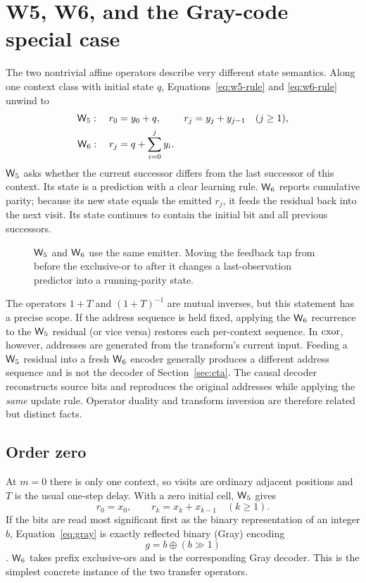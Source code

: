 \section{W5, W6, and the Gray-code special case}\label{sec:special}

The two nontrivial affine operators describe very different state semantics.  Along one context
class with initial state $q$, Equations~\eqref{eq:w5-rule} and \eqref{eq:w6-rule} unwind to
\begin{align}
\mathsf{W}_{5}:\quad
  r_0&=y_0+q,
  &r_j&=y_j+y_{j-1} &&(j\ge1),\label{eq:w5-unwind}\\
\mathsf{W}_{6}:\quad
  r_j&=q+\sum_{i=0}^{j}y_i .&&&&\label{eq:w6-unwind}
\end{align}
$\mathsf{W}_{5}$ asks whether the current successor differs from the last successor of this context.  Its
state is a prediction with a clear learning rule.  $\mathsf{W}_{6}$ reports cumulative parity; because its
new state equals the emitted $r_j$, it feeds the residual back into the next visit.  Its state
continues to contain the initial bit and all previous successors.

\begin{figure}[ht]
  \centering
  \hspace{1.1cm}
  \caption{$\mathsf{W}_{5}$ and $\mathsf{W}_{6}$ use the same emitter.  Moving the feedback tap from before the
  exclusive-or to after it changes a last-observation predictor into a running-parity state.}
  \label{fig:w5-w6-taps}
\end{figure}

The operators $1+T$ and $(1+T)^{-1}$ are mutual inverses, but this statement has a precise scope.
If the address sequence is held fixed, applying the $\mathsf{W}_{6}$ recurrence to the $\mathsf{W}_{5}$ residual (or
vice versa) restores each per-context sequence.  In $\mathrm{cxor}$, however, addresses are generated
from the transform's current input.  Feeding a $\mathsf{W}_{5}$ residual into a fresh $\mathsf{W}_{6}$
encoder generally produces a different address sequence and is not the decoder of
Section~\ref{sec:cta}.  The causal decoder reconstructs source bits and reproduces the original
addresses while applying the \emph{same} update rule.  Operator duality and transform inversion
are therefore related but distinct facts.

\subsection{Order zero}

At $m=0$ there is only one context, so visits are ordinary adjacent positions and $T$ is the
usual one-step delay.  With a zero initial cell, $\mathsf{W}_{5}$ gives
\begin{equation}\label{eq:gray}
  r_0=x_0,
  \qquad
  r_k=x_k+x_{k-1}\quad(k\ge1).
\end{equation}
If the bits are read most significant first as the binary representation of an integer $b$,
Equation~\eqref{eq:gray} is exactly reflected binary (Gray) encoding
\[
  g=b\mathbin{\oplus}(b\mathbin{\gg}1)
\]
\cite{gray1953}.  $\mathsf{W}_{6}$ takes prefix exclusive-ors and is the corresponding Gray decoder.  This
is the simplest concrete instance of the two transfer operators.

